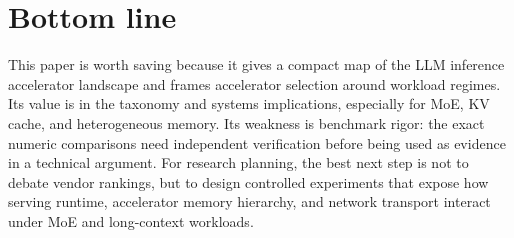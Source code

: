 \documentclass[10pt]{article}
\begin{document}
\section{Bottom line}
This paper is worth saving because it gives a compact map of the LLM inference accelerator landscape and frames accelerator selection around workload regimes. Its value is in the taxonomy and systems implications, especially for MoE, KV cache, and heterogeneous memory. Its weakness is benchmark rigor: the exact numeric comparisons need independent verification before being used as evidence in a technical argument. For research planning, the best next step is not to debate vendor rankings, but to design controlled experiments that expose how serving runtime, accelerator memory hierarchy, and network transport interact under MoE and long-context workloads.
\end{document}
